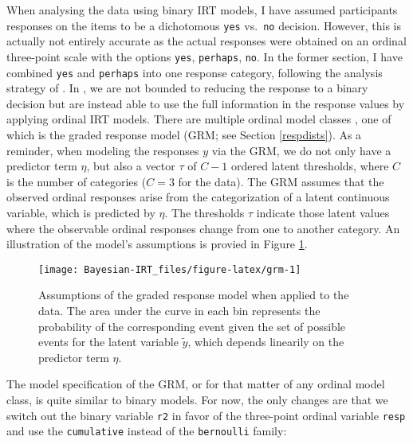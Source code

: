 \documentclass[
]{jss}
\begin{document}
When analysing the  data using binary IRT models, I have
assumed participants responses on the items to be a dichotomous
\texttt{yes} vs.~\texttt{no} decision. However, this is actually not
entirely accurate as the actual responses were obtained on an ordinal
three-point scale with the options \texttt{yes}, \texttt{perhaps},
\texttt{no}. In the former section, I have combined \texttt{yes} and
\texttt{perhaps} into one response category, following the analysis
strategy of \citet{deboeck2011}. In , we are not bounded to
reducing the response to a binary decision but are instead able to use
the full information in the response values by applying ordinal IRT
models. There are multiple ordinal model classes
\citep{agresti2010, buerkner2019}, one of which is the graded response
model (GRM; see Section \ref{respdists}). As a reminder, when modeling
the responses \(y\) via the GRM, we do not only have a predictor term
\(\eta\), but also a vector \(\tau\) of \(C-1\) ordered latent
thresholds, where \(C\) is the number of categories (\(C = 3\) for the
 data). The GRM assumes that the observed ordinal
responses arise from the categorization of a latent continuous variable,
which is predicted by \(\eta\). The thresholds \(\tau\) indicate those
latent values where the observable ordinal responses change from one to
another category. An illustration of the model's assumptions is provied
in Figure \ref{fig:grm}.

\begin{CodeChunk}
\begin{figure}

{\centering \texttt{[image: Bayesian-IRT\_files/figure-latex/grm-1]} 

}

\caption{Assumptions of the graded response model when applied to the  data. The area under the curve in each bin represents the probability of the corresponding event given the set of possible events for the latent variable $\tilde{y}$, which depends linearily on the predictor term $\eta$.}\label{fig:grm}
\end{figure}
\end{CodeChunk}

The model specification of the GRM, or for that matter of any ordinal
model class, is quite similar to binary models. For now, the only
changes are that we switch out the binary variable \texttt{r2} in favor
of the three-point ordinal variable \texttt{resp} and use the
\texttt{cumulative} instead of the \texttt{bernoulli} family:
\end{document}
